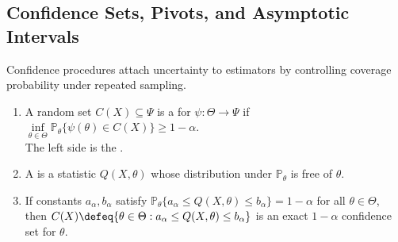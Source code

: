 \subsection{Confidence Sets, Pivots, and Asymptotic Intervals}

Confidence procedures attach uncertainty to estimators by controlling coverage probability under repeated sampling.

\begin{definition} \label{def:confidence-set-coverage} \label{def:pivot-confidence-construction} 
\begin{enumerate}[label=(\roman*)]
\setlength{\itemsep}{0pt}
\item A random set $C(X)\subseteq\Psi$ is a  for $\psi:\Theta\to\Psi$ if $\inf\limits_{\theta\in\Theta}\mathbb{P}_\theta\{\psi(\theta)\in C(X)\}\geq1-\alpha$.\\
The left side is the .
\item A  is a statistic $Q(X,\theta)$ whose distribution under $\mathbb{P}_\theta$ is free of $\theta$.
\item If constants $a_\alpha,b_\alpha$ satisfy $\mathbb{P}_\theta\{a_\alpha\leq Q(X,\theta)\leq b_\alpha\}=1-\alpha$ for all $\theta\in\Theta$,\\
then $C(X)\defeq\{\theta\in\Theta:a_\alpha\leq Q(X,\theta)\leq b_\alpha\}$ is an exact $1-\alpha$ confidence set for $\theta$.
\end{enumerate}
\end{definition}


